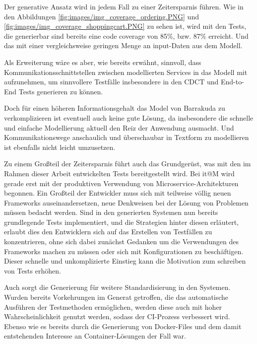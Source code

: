 \documentclass[12pt,a4paper,bibliography=totocnumbered,listof=totocnumbered]{scrartcl}
\begin{document}
Der generative Ansatz wird in jedem Fall zu einer Zeitersparnis führen. Wie in den Abbildungen \ref{fig:images/img_coverage_ordering.PNG} und \ref{fig:images/img_coverage_shoppingcart.PNG} zu sehen ist, wird mit den Tests, die generierbar sind bereits eine code coverage von 85\%, bzw. 87\% erreicht. Und das mit einer vergleichsweise geringen Menge an input-Daten aus dem Modell.


Als Erweiterung wäre es aber, wie bereits erwähnt, sinnvoll, dass Kommunikationsschnittstellen zwischen modellierten Services in das Modell mit aufzunehmen, um sinnvollere Testfälle insbesondere in den \ac{CDCT} und End-to-End Tests generieren zu können.

Doch für einen höheren Informationsgehalt das Model von Barrakuda zu verkomplizieren ist eventuell auch keine gute Lösung, da insbesondere die schnelle und einfache Modellierung aktuell den Reiz der Anwendung ausmacht. Und Kommunikationswege anschaulich und überschaubar in Textform zu modellieren ist ebenfalls nicht leicht umzusetzen.

Zu einem Großteil der Zeitersparnis führt auch das Grundgerüst, was mit den im Rahmen dieser Arbeit entwickelten Tests bereitgestellt wird. Bei it@M wird gerade erst mit der produktiven Verwendung von Microservice-Architekturen begonnen. Ein Großteil der Entwickler muss sich mit teilweise völlig neuen Frameworks auseinandersetzen, neue Denkweisen bei der Lösung von Problemen müssen bedacht werden. Sind in den generierten Systemen nun bereits grundlegende Tests implementiert, und die Strategien hinter diesen erläutert, erlaubt dies den Entwicklern sich auf das Erstellen von Testfällen zu konzentrieren, ohne sich dabei zunächst Gedanken um die Verwendungen des Frameworks machen zu müssen oder sich mit Konfigurationen zu beschäftigen. Dieser schnelle und unkomplizierte Einstieg kann die Motivation zum schreiben von Tests erhöhen.

Auch sorgt die Generierung für weitere Standardisierung in den Systemen. Wurden bereits Vorkehrungen im Generat getroffen, die das automatische Ausführen der Testmethoden ermöglichen, werden diese auch mit hoher Wahrscheinlichkeit genutzt werden, sodass der \acs{CI}-Prozess verbessert wird. Ebenso wie es bereits durch die Generierung von Docker-Files und dem damit entstehenden Interesse an Container-Lösungen der Fall war.
\end{document}
